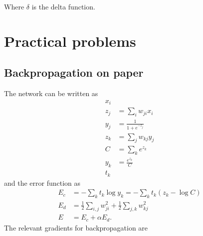 \documentclass[a4paper,11pt]{article}
\begin{document}
	\noindent Where $\delta$ is the delta function.

	\section{Practical problems}
	\subsection{Backpropagation on paper}
  The network can be written as
  \begin{align*}
    \tag{input layer}
      x_i\\
    \tag{hidden layer weighting}
      z_j&=\sum_iw_{ji}x_i\\
    \tag{hidden layer activation}
      y_j&=\frac{1}{1+e^{-z_j}}\\
    \tag{output layer weighting}
      z_k&=\sum_jw_{kj}y_j\\
    \tag{output layer normalization}
      C&=\sum_ke^{z_k}\\
    \tag{output layer activation}
      y_k&=\frac{e^{z_k}}{C}\\
    \tag{output target}
      t_k
  \end{align*}
  and the error function as
  \begin{align*}
    \tag{classification error}
      E_c &= -\sum_kt_k\log y_k=-\sum_kt_k(z_k-\log C) \\
    \tag{weight decay error}
      E_d &= \frac{1}{2}\sum_{i,j}w_{ji}^2 + \frac{1}{2}\sum_{j,k}w_{kj}^2\\
    \tag{total error}
      E &= E_c + \alpha E_d.
  \end{align*}
  The relevant gradients for backpropagation are
\end{document}
